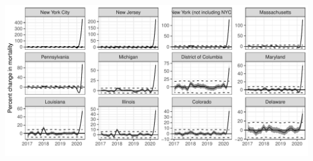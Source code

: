 \documentclass[11pt]{article}
\begin{document}
\begin{suppfigure}[ht]
	\centering
	\includegraphics[width=1\linewidth]{figs/supp-figure-5.pdf} 
	\caption{}
	\label{supp-fig:covid19-states}
\end{suppfigure}
\end{document}

